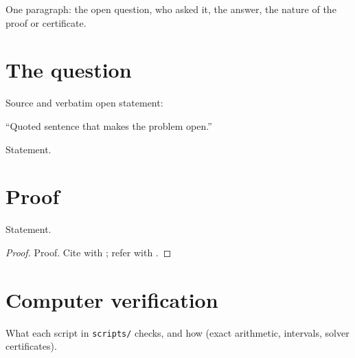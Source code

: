 \documentclass[11pt,a4paper]{report}
\begin{document}
\makepapertitle

\begin{paperabstract}
One paragraph: the open question, who asked it, the answer, the nature of the proof or certificate.
\end{paperabstract}

\section*{The question}
Source and verbatim open statement:
\begin{openquote}
``Quoted sentence that makes the problem open.''
\end{openquote}

\begin{theorem}\label{thm:main}
Statement.
\end{theorem}

\section{Proof}
\begin{lemma}[note=optional name]\label{lem:one}
Statement.
\end{lemma}
\begin{proof}
Proof. Cite with \autocite{Key}; refer with .
\end{proof}

\section{Computer verification}
What each script in \texttt{scripts/} checks, and how (exact arithmetic, intervals, solver certificates).

\paperreferences
\end{document}
